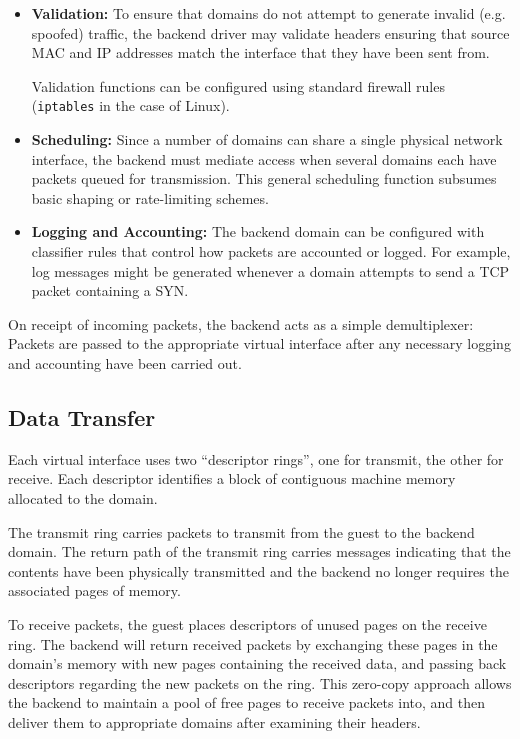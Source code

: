 \documentclass[11pt,twoside,final,openright]{report}
\begin{document}
\begin{itemize}
\item {\bf Validation:} To ensure that domains do not attempt to
  generate invalid (e.g. spoofed) traffic, the backend driver may
  validate headers ensuring that source MAC and IP addresses match the
  interface that they have been sent from.

  Validation functions can be configured using standard firewall rules
  ({\small{\tt iptables}} in the case of Linux).
  
\item {\bf Scheduling:} Since a number of domains can share a single
  physical network interface, the backend must mediate access when
  several domains each have packets queued for transmission.  This
  general scheduling function subsumes basic shaping or rate-limiting
  schemes.
  
\item {\bf Logging and Accounting:} The backend domain can be
  configured with classifier rules that control how packets are
  accounted or logged.  For example, log messages might be generated
  whenever a domain attempts to send a TCP packet containing a SYN.
\end{itemize}

On receipt of incoming packets, the backend acts as a simple
demultiplexer: Packets are passed to the appropriate virtual interface
after any necessary logging and accounting have been carried out.

\subsection{Data Transfer}

Each virtual interface uses two ``descriptor rings'', one for
transmit, the other for receive.  Each descriptor identifies a block
of contiguous machine memory allocated to the domain.

The transmit ring carries packets to transmit from the guest to the
backend domain.  The return path of the transmit ring carries messages
indicating that the contents have been physically transmitted and the
backend no longer requires the associated pages of memory.

To receive packets, the guest places descriptors of unused pages on
the receive ring.  The backend will return received packets by
exchanging these pages in the domain's memory with new pages
containing the received data, and passing back descriptors regarding
the new packets on the ring.  This zero-copy approach allows the
backend to maintain a pool of free pages to receive packets into, and
then deliver them to appropriate domains after examining their
headers.
\end{document}
